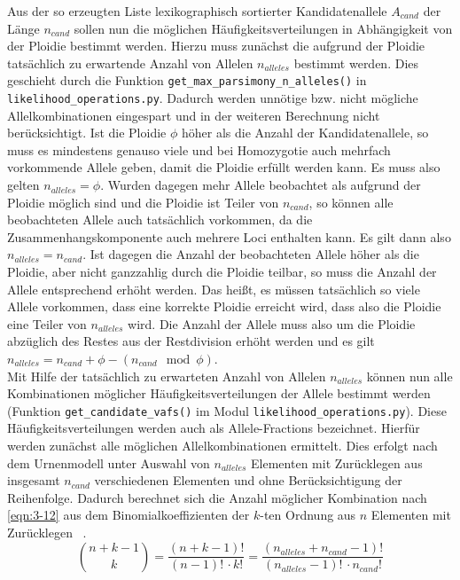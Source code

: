 Aus der so erzeugten Liste lexikographisch sortierter Kandidatenallele $ A_{cand} $ der Länge $ n_{cand} $ sollen nun die möglichen Häufigkeitsverteilungen in Abhängigkeit von der Ploidie bestimmt werden. Hierzu muss zunächst die aufgrund der Ploidie tatsächlich zu erwartende Anzahl von Allelen $n_{alleles}$ bestimmt werden. Dies geschieht durch die Funktion \lstinline|get_max_parsimony_n_alleles()| in \lstinline|likelihood_operations.py|. Dadurch werden unnötige bzw. nicht mögliche Allelkombinationen eingespart und in der weiteren Berechnung nicht berücksichtigt. Ist die Ploidie $ \phi $ höher als die Anzahl der Kandidatenallele, so muss es mindestens genauso viele und bei Homozygotie auch mehrfach vorkommende Allele geben, damit die Ploidie erfüllt werden kann. Es muss also gelten $ n_{alleles} = \phi $. Wurden dagegen mehr Allele beobachtet als aufgrund der Ploidie möglich sind und die Ploidie ist Teiler von $n_{cand}$, so können alle beobachteten Allele auch tatsächlich vorkommen, da die Zusammenhangskomponente auch mehrere Loci enthalten kann. Es gilt dann also $ n_{alleles} = n_{cand} $. Ist dagegen die Anzahl der beobachteten Allele höher als die Ploidie, aber nicht ganzzahlig durch die Ploidie teilbar, so muss die Anzahl der Allele entsprechend erhöht werden. Das heißt, es müssen tatsächlich so viele Allele vorkommen, dass eine korrekte Ploidie erreicht wird, dass also die Ploidie eine Teiler von $ n_{alleles} $ wird. Die Anzahl der Allele muss also um die Ploidie abzüglich des Restes aus der Restdivision erhöht werden und es gilt $ n_{alleles} = n_{cand} + \phi - (n_{cand} \mod \phi)$. \\

Mit Hilfe der tatsächlich zu erwarteten Anzahl von Allelen $ n_{alleles} $ können nun alle Kombinationen möglicher Häufigkeitsverteilungen der Allele bestimmt werden (Funktion \linebreak \lstinline|get_candidate_vafs()| im Modul \lstinline|likelihood_operations.py|). Diese Häufigkeitsverteilungen werden auch als Allele-Fractions bezeichnet. Hierfür werden zunächst alle möglichen Allelkombinationen ermittelt. Dies erfolgt nach dem Urnenmodell unter Auswahl von $ n_{alleles} $ Elementen mit Zurücklegen aus insgesamt $ n_{cand} $ verschiedenen Elementen und ohne Berücksichtigung der Reihenfolge. Dadurch berechnet sich die Anzahl möglicher Kombination nach \eqref{eqn:3-12} aus dem  Binomialkoeffizienten der $k$-ten Ordnung aus $ n $ Elementen mit Zurücklegen ~\cite{tb_stat,bronst}.
\begin{equation} \label{eqn:3-12}
\tag{3-12}
\binom{n + k - 1}{k} = \frac{(n+k-1)!}{(n-1)!\, \cdotp k!} = \frac{(n_{alleles}+n_{cand}-1)!}{(n_{alleles}-1)!\, \cdotp n_{cand}!} 
\end{equation}


